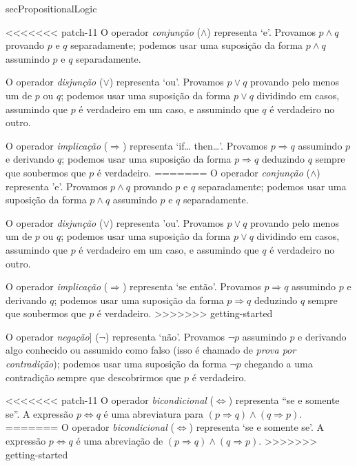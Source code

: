 \begin{itemizar}
\begin{axiom}
\begin{tldr}{secPropositionalLogic}
\begin{tldrlist}
<<<<<<< patch-11
O operador \textit{conjunção} ($\wedge$) representa `e'. Provamos $p \wedge q$ provando $p$ e $q$ separadamente; podemos usar uma suposição da forma $p \wedge q$ assumindo $p$ e $q$ separadamente.

O operador \textit{disjunção} ($\vee$) representa `ou'. Provamos $p \vee q$ provando pelo menos um de $p$ ou $q$; podemos usar uma suposição da forma $p \vee q$ dividindo em casos, assumindo que $p$ é verdadeiro em um caso, e assumindo que $q$ é verdadeiro no outro.

O operador \textit{implicação} ($\Rightarrow$) representa `if\dots{} then\dots{}'. Provamos $p \Rightarrow q$ assumindo $p$ e derivando $q$; podemos usar uma suposição da forma $p \Rightarrow q$ deduzindo $q$ sempre que soubermos que $p$ é verdadeiro.
=======
O operador \textit{conjunção} ($\wedge$) representa 'e'. Provamos $p \wedge q$ provando $p$ e $q$ separadamente; podemos usar uma suposição da forma $p \wedge q$ assumindo $p$ e $q$ separadamente.

O operador \textit{disjunção} ($\vee$) representa 'ou'. Provamos $p \vee q$ provando pelo menos um de $p$ ou $q$; podemos usar uma suposição da forma $p \vee q$ dividindo em casos, assumindo que $p$ é verdadeiro em um caso, e assumindo que $q$ é verdadeiro no outro.

O operador \textit{implicação} ($\Rightarrow$) representa `se\pontos{} então\pontos{}'. Provamos $p \Rightarrow q$ assumindo $p$ e derivando $q$; podemos usar uma suposição da forma $p \Rightarrow q$ deduzindo $q$ sempre que soubermos que $p$ é verdadeiro.
>>>>>>> getting-started

O operador \textit{negação}] ($\neg$) representa `não'. Provamos $\neg p$ assumindo $p$ e derivando algo conhecido ou assumido como falso (isso é chamado de \textit{prova por contradição}); podemos usar uma suposição da forma $\neg p$ chegando a uma contradição sempre que descobrirmos que $p$ é verdadeiro.

<<<<<<< patch-11
O operador \textit{bicondicional} ($\Leftrightarrow$) representa “se e somente se”. A expressão $p \Leftrightarrow q$ 
é uma abreviatura para $(p \Rightarrow q) \wedge (q \Rightarrow p)$.
=======
O operador \textit{bicondicional} ($\Leftrightarrow$) representa `se e somente se'. A expressão $p \Leftrightarrow q$ é uma abreviação de $(p \Rightarrow q) \wedge (q \Rightarrow p)$.
>>>>>>> getting-started
\end{tldrlist}


\end{tldr}
\end{axiom}
\end{itemizar}
